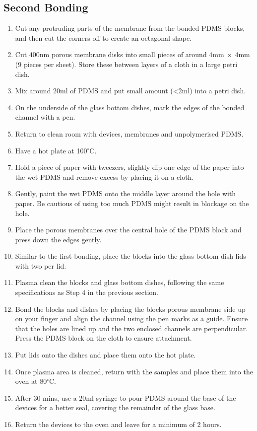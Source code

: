 \subsection*{Second Bonding}

\begin{enumerate}
 \setlength\itemsep{-0.1em}
	\item Cut any protruding parts of the membrane from the bonded PDMS blocks, and then cut the corners off to create an octagonal shape.
	\item Cut $400  \text{nm}$ porous membrane disks into small pieces of around $4  \text{mm} \: \times \: 4  \text{mm}$ (9 pieces per sheet). Store these between layers of a cloth in a large petri dish.
	\item Mix around $20  \text{ml}$ of PDMS and put small amount (<2ml) into a petri dish.
	\item On the underside of the glass bottom dishes, mark the edges of the bonded channel with a pen.
	\item Return to clean room with devices, membranes and unpolymerised PDMS.
	\item Have a hot plate at 100$^{\circ}$C.
	\item Hold a piece of paper with tweezers, slightly dip one edge of the paper into the wet PDMS and remove excess by placing it on a cloth. 
	\item Gently, paint the wet PDMS onto the middle layer around the hole with paper. Be cautious of using too much PDMS might result in blockage on the hole.
	\item Place the porous membranes over the central hole of the PDMS block and press down the edges gently. 
	\item Similar to the first bonding, place the blocks into the glass bottom dish lids with two per lid. 
	\item Plasma clean the blocks and glass bottom dishes, following the same specifications as Step 4 in the previous section.
	\item Bond the blocks and dishes by placing the blocks porous membrane side up on your finger and align the channel using the pen marks as a guide. Ensure that the holes are lined up and the two enclosed channels are perpendicular. Press the PDMS block on the cloth to ensure attachment. 
	\item Put lids onto the dishes and place them onto the hot plate.
	\item Once plasma area is cleaned, return with the samples and place them into the oven at 80$^{\circ}$C. 
	\item After 30 mins, use a $20  \text{ml}$ syringe to pour PDMS around the base of the devices for a better seal, covering the remainder of the glass base.
	\item Return the devices to the oven and leave for a minimum of 2 hours.
\end{enumerate}

